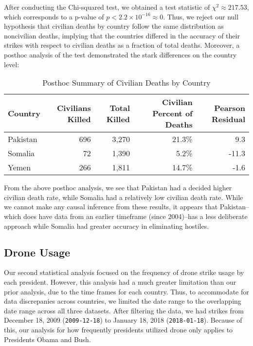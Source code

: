 \documentclass[
]{article}
\begin{document}
After conducting the Chi-squared test, we obtained a test statistic of
\(\chi^2 \approx 217.53\), which corresponds to a p-value of
\(p < 2.2 \times 10^{-16} \approx 0\). Thus, we reject our null
hypothesis that civilian deaths by country follow the same distribution
as noncivilian deaths, implying that the countries differed in the
accuracy of their strikes with respect to civilian deaths as a fraction
of total deaths. Moreover, a posthoc analysis of the test demonstrated
the stark differences on the country level:

\begin{table}[H]

\caption{\label{tab:drone_acc_posthoc}Posthoc Summary of Civilian Deaths by Country}
\centering
\begin{tabular}[t]{lrrrr}
\toprule
Country & Civilians Killed & Total Killed & Civilian Percent of Deaths & Pearson Residual\\
\midrule
Pakistan & 696 & 3,270 & 21.3\% & 9.3\\
Somalia & 72 & 1,390 & 5.2\% & -11.3\\
Yemen & 266 & 1,811 & 14.7\% & -1.6\\
\bottomrule
\end{tabular}
\end{table}

From the above posthoc analysis, we see that Pakistan had a decided
higher civilian death rate, while Somalia had a relatively low civilian
death rate. While we cannot make any causal inference from these
results, it appears that Pakistan--which does have data from an earlier
timeframe (since 2004)--has a less deliberate approach while Somalia had
greater accuracy in eliminating hostiles.

\hypertarget{drone-usage}{%
\subsection{Drone Usage}\label{drone-usage}}

Our second statistical analysis focused on the frequency of drone strike
usage by each president. However, this analysis had a much greater
limitation than our prior analysis, due to the time frames for each
country. Thus, to accommodate for data discrepanies across countries, we
limited the date range to the overlapping date range across all three
datasets. After filtering the data, we had strikes from December 18,
2009 (\texttt{2009-12-18}) to January 18, 2018 (\texttt{2018-01-18}).
Because of this, our analysis for how frequently presidents utilized
drone only applies to Presidents Obama and Bush.
\end{document}

